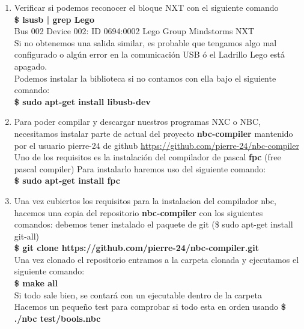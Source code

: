 \documentclass[oneside,twocolumn]{article}
\begin{document}
\begin{enumerate}
\item Verificar si podemos reconocer el bloque NXT con el siguiente comando\\
  \textbf{\$ lsusb | grep Lego}\\
  Bus 002 Device 002: ID 0694:0002 Lego Group Mindstorms NXT\\

  Si no obtenemos una salida similar, es probable que tengamos algo mal configurado o algún error en la comunicación USB ó el Ladrillo Lego está apagado.\\

  Podemos instalar la biblioteca si no contamos con ella bajo el siguiente comando:\\

  \textbf{\$ sudo apt-get install libusb-dev}
  
\item Para poder compilar y descargar nuestros programas NXC o NBC, necesitamos instalar parte de actual del proyecto \textbf{nbc-compiler} mantenido por el usuario pierre-24 de github \url{https://github.com/pierre-24/nbc-compiler}\\
  
  Uno de los requisitos es la instalación del compilador de pascal \textbf{fpc} (free pascal compiler) Para instalarlo haremos uso del siguiente comando:\\

  \textbf{\$ sudo apt-get install fpc}

\item Una vez cubiertos los requisitos para la instalacion del compilador nbc, hacemos una copia del repositorio \textbf{nbc-compiler} con los siguientes comandos:
  debemos tener instalado el paquete de git (\$ sudo apt-get install git-all)\\

  \textbf{\$ git clone https://github.com/pierre-24/nbc-compiler.git}\\

  Una vez clonado el repositorio entramos a la carpeta clonada y ejecutamos el siguiente comando:\\

  \textbf{\$ make all}\\

  Si todo sale bien, se contará con un ejecutable dentro de la carpeta\\
  Hacemos un pequeño test para comprobar si todo esta en orden usando \textbf{\$ ./nbc test/bools.nbc}\\


\end{enumerate}
\end{document}
